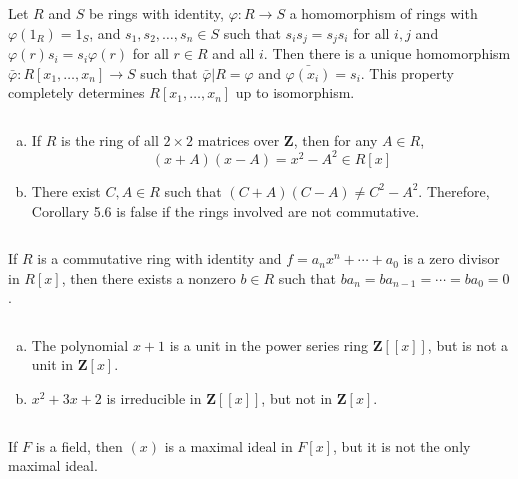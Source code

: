 \begin{ex}
    Let $R$ and $S$ be rings with identity, $\varphi:R\to S$ a homomorphism of rings with $\varphi(1_{R})=1_{S}$, and $s_{1},s_{2},\dots,s_{n}\in S$ such that $s_{i}s_{j}=s_{j}s_{i}$ for all $i,j$ and $\varphi(r)s_{i}=s_{i}\varphi(r)$ for all $r\in R$ and all $i$. Then there is a unique homomorphism $\bar{\varphi}:R[x_{1},\dots,x_{n}]\to S$ such that $\bar{\varphi}|R=\varphi$ and $\bar{\varphi(x_{i})}=s_{i}$. This property completely determines $R[x_{1},\dots,x_{n}]$ up to isomorphism.
\end{ex}

$$ $$

\begin{ex}
    \begin{enumerate}[(a)]
        \item If $R$ is the ring of all $2\times 2$ matrices over $\mathbf{Z}$, then for any $A\in R$,\[(x+A)(x-A)=x^{2}-A^{2}\in R[x]\]
        \item There exist $C,A\in R$ such that $(C+A)(C-A)\neq C^{2}-A^{2}$. Therefore, Corollary 5.6 is false if the rings involved are not commutative.
    \end{enumerate}
\end{ex}

$$ $$

\begin{ex}
    If $R$ is a commutative ring with identity and $f=a_{n}x^{n}+\cdots+a_{0}$ is a zero divisor in $R[x]$, then there exists a nonzero $b\in R$ such that $ba_{n}=ba_{n-1}=\cdots=ba_{0}=0$.
\end{ex}

$$ $$

\begin{ex}
    \begin{enumerate}[(a)]
        \item The polynomial $x+1$ is a unit in the power series ring $\mathbf{Z}[[x]]$, but is not a unit in $\mathbf{Z}[x]$.
        \item $x^{2}+3x+2$ is irreducible in $\mathbf{Z}[[x]]$, but not in $\mathbf{Z}[x]$.
    \end{enumerate}
\end{ex}

$$ $$

\begin{ex}
    If $F$ is a field, then $(x)$ is a maximal ideal in $F[x]$, but it is not the only maximal ideal.
\end{ex}

